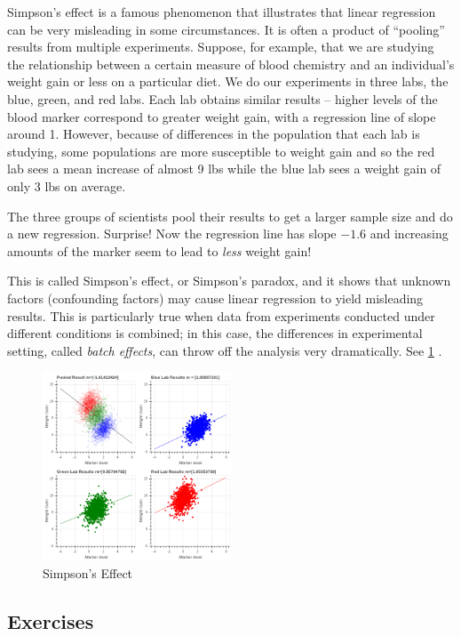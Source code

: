 \documentclass[
  oneside]{scrbook}
\begin{document}
Simpson's effect is a famous phenomenon that illustrates that linear
regression can be very misleading in some circumstances. It is often a
product of ``pooling'' results from multiple experiments. Suppose, for
example, that we are studying the relationship between a certain measure
of blood chemistry and an individual's weight gain or less on a
particular diet. We do our experiments in three labs, the blue, green,
and red labs. Each lab obtains similar results -- higher levels of the
blood marker correspond to greater weight gain, with a regression line
of slope around 1. However, because of differences in the population
that each lab is studying, some populations are more susceptible to
weight gain and so the red lab sees a mean increase of almost 9 lbs
while the blue lab sees a weight gain of only 3 lbs on average.

The three groups of scientists pool their results to get a larger sample
size and do a new regression. Surprise! Now the regression line has
slope \(-1.6\) and increasing amounts of the marker seem to lead to
\emph{less} weight gain!

This is called Simpson's effect, or Simpson's paradox, and it shows that
unknown factors (confounding factors) may cause linear regression to
yield misleading results. This is particularly true when data from
experiments conducted under different conditions is combined; in this
case, the differences in experimental setting, called \emph{batch
effects}, can throw off the analysis very dramatically. See
\cref{fig:simpsons} .

\begin{figure}
\hypertarget{fig:simpsons}{%
\centering
\includegraphics[width=0.5\textwidth,height=\textheight]{img/SimpsonsEffect.png}
\caption{Simpson's Effect}\label{fig:simpsons}
}
\end{figure}

\hypertarget{exercises-1}{%
\subsection{Exercises}\label{exercises-1}}
\end{document}
